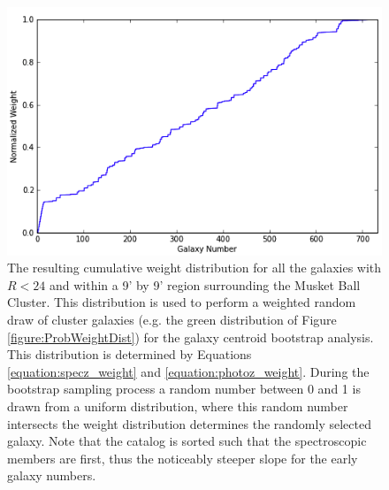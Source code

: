 \begin{figure}
\centering
\includegraphics[width=4.5in]{Chapter4/AnalysisFiles/cumnormwghtdist.png}
\caption[Probabilistic scheme; cumulative normalized weight distribution for galaxies being in the Musket Ball Cluster.]{
The resulting cumulative weight distribution for all the galaxies with $R<24$ and within a 9' by 9' region surrounding the Musket Ball Cluster.
This distribution is used to perform a weighted random draw of cluster galaxies (e.g. the green distribution of Figure \ref{figure:ProbWeightDist}) for the galaxy centroid bootstrap analysis.
This distribution is determined by Equations \ref{equation:specz_weight} and \ref{equation:photoz_weight}.
During the bootstrap sampling process a random number between 0 and 1 is drawn from a uniform distribution, where this random number intersects the weight distribution determines the randomly selected galaxy.
Note that the catalog is sorted such that the spectroscopic members are first, thus the noticeably steeper slope for the early galaxy numbers.
}
\label{figure:NormWeightDist}
\end{figure}

